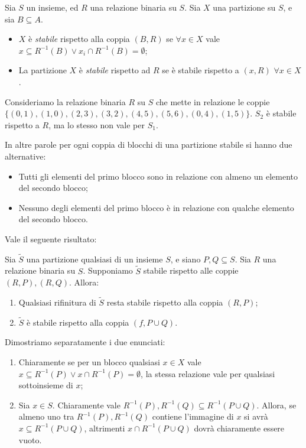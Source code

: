 \begin{definition}
    Sia $S$ un insieme, ed $R$ una relazione binaria su $S$. Sia $X$ una partizione su $S$, e sia $B \subseteq A$.
    \begin{itemize}
        \item $X$ è \emph{stabile} rispetto alla coppia $(B,R)$ se $\forall x \in X$ vale $x \subseteq R^{-1}(B) \lor x_i \cap R^{-1}(B) = \emptyset$;
        \item La partizione $X$ è \emph{stabile} rispetto ad $R$ se è stabile rispetto a $(x,R) \,\,\forall x \in X$.
    \end{itemize}
\end{definition}
\begin{example}
    \label{exa:set_partition_stable}
    Consideriamo la relazione binaria $R$ su $S$ che mette in relazione le coppie $\{(0,1),(1,0),(2,3),(3,2),(4,5),(5,6),(0,4),(1,5)\}$. $S_2$ è stabile rispetto a $R$, ma lo stesso non vale per $S_1$.
\end{example}
In altre parole per ogni coppia di blocchi di una partizione stabile si hanno due alternative:
\begin{itemize}
    \item Tutti gli elementi del primo blocco sono in relazione con almeno un elemento del secondo blocco;
    \item Nessuno degli elementi del primo blocco è in relazione con qualche elemento del secondo blocco.
\end{itemize}
Vale il seguente risultato:
\begin{proposition}
    Sia $\widetilde{S}$ una partizione qualsiasi di un insieme $S$, e siano $P,Q \subseteq S$. Sia $R$ una relazione binaria su $S$. Supponiamo $\widetilde{S}$ stabile rispetto alle coppie $(R,P),(R,Q)$. Allora:
    \begin{enumerate}
        \item Qualsiasi rifinitura di $\widetilde{S}$ resta stabile rispetto alla coppia $(R,P)$;
        \item $\widetilde{S}$ è stabile rispetto alla coppia $(f,P \cup Q)$.
    \end{enumerate}
\end{proposition}
\begin{proof2}
    Dimostriamo separatamente i due enunciati:
    \begin{enumerate}
        \item Chiaramente se per un blocco qualsiasi $x \in X$ vale $x \subseteq R^{-1}(P) \lor x \cap R^{-1}(P) = \emptyset$, la stessa relazione vale per qualsiasi sottoinsieme di $x$;
        \item Sia $x \in S$. Chiaramente vale $R^{-1}(P),R^{-1}(Q) \subseteq R^{-1}(P \cup Q)$. Allora, se almeno uno tra $R^{-1}(P),R^{-1}(Q)$ contiene l'immagine di $x$ si avrà $x \subseteq R^{-1}(P \cup Q)$, altrimenti $x \cap R^{-1}(P \cup Q)$ dovrà chiaramente essere vuoto.
    \end{enumerate}
    \vspace*{-0.75cm}
\end{proof2}
